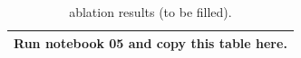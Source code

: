 \begin{table}[h]\centering\caption{ablation results (to be filled).}\small\begin{tabular}{l}\toprule Run notebook 05 and copy this table here.\\\bottomrule\end{tabular}\end{table}
